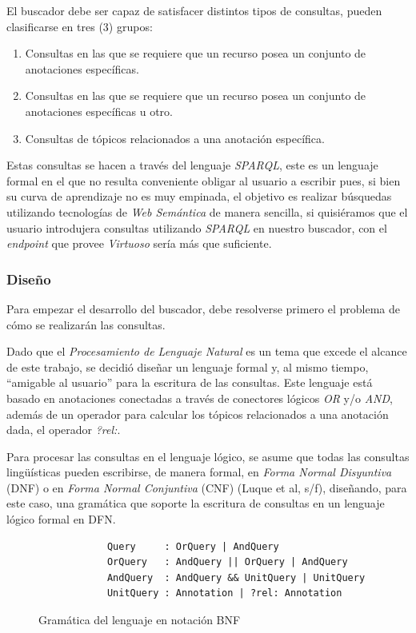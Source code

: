 \begin{itemize}
El buscador debe ser capaz de satisfacer distintos tipos de consultas, pueden clasificarse en tres (3) grupos:

\begin{enumerate}
    \item Consultas en las que se requiere que un recurso posea un conjunto de anotaciones específicas.
    \item Consultas en las que se requiere que un recurso posea un conjunto de anotaciones específicas u otro.
    \item Consultas de tópicos relacionados a una anotación específica.
\end{enumerate}

Estas consultas se hacen a través del lenguaje \textit{SPARQL}, este es un lenguaje formal en el que no resulta conveniente obligar al usuario a escribir pues, si bien su curva de aprendizaje no es muy empinada, el objetivo es realizar búsquedas utilizando tecnologías de \textit{Web Semántica} de manera sencilla, si quisiéramos que el usuario introdujera consultas utilizando \textit{SPARQL} en nuestro buscador, con el \textit{endpoint} que provee \textit{Virtuoso} sería más que suficiente.

\subsubsection{Diseño}
Para empezar el desarrollo del buscador, debe resolverse primero el problema de cómo se realizarán las consultas.

Dado que el \textit{Procesamiento de Lenguaje Natural} es un tema que excede el alcance de este trabajo, se decidió diseñar un lenguaje formal y, al mismo tiempo, ``amigable al usuario'' para la escritura de las consultas. Este lenguaje está basado en anotaciones conectadas a través de conectores lógicos \textit{OR} y/o \textit{AND}, además de un operador para calcular los tópicos relacionados a una anotación dada, el operador \textit{?rel:}.

Para procesar las consultas en el lenguaje lógico, se asume que todas las consultas lingüísticas pueden escribirse, de manera formal, en \textit{Forma Normal Disyuntiva} (DNF) o en \textit{Forma Normal Conjuntiva} (CNF) (Luque et al, s/f), diseñando, para este caso, una gramática que soporte la escritura de consultas en un lenguaje lógico formal en DFN.

\begin{figure}[!h]
    \begin{center}
        \begin{verbatim} 
            Query     : OrQuery | AndQuery
            OrQuery   : AndQuery || OrQuery | AndQuery
            AndQuery  : AndQuery && UnitQuery | UnitQuery
            UnitQuery : Annotation | ?rel: Annotation
        \end{verbatim}
        \caption{Gramática del lenguaje en notación BNF}
        \label{BNFGrammar}
    \end{center}
\end{figure}


\end{itemize}
